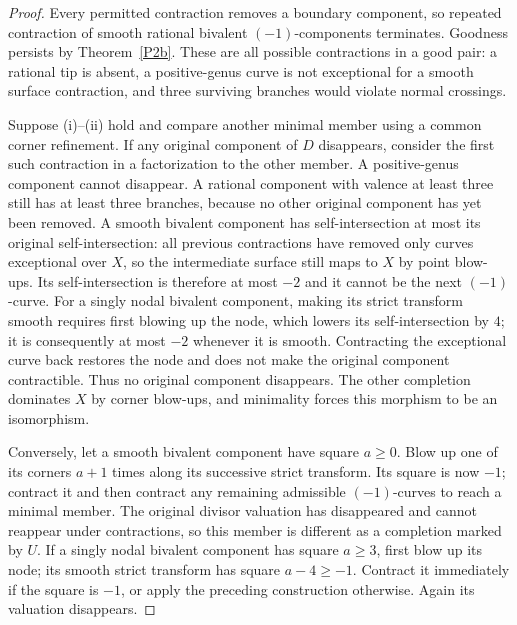 \begin{proof}
Every permitted contraction removes a boundary component, so repeated
contraction of smooth rational bivalent $(-1)$-components terminates.
Goodness persists by Theorem~\ref{P2b}.  These are all possible contractions in
a good pair: a rational tip is absent, a positive-genus curve is not exceptional
for a smooth surface contraction, and three surviving branches would violate
normal crossings.

Suppose (i)--(ii) hold and compare another minimal member using a common corner
refinement.  If any original component of $D$ disappears, consider the first
such contraction in a factorization to the other member.  A positive-genus
component cannot disappear.  A rational component with valence at least three
still has at least three branches, because no other original component has yet
been removed.  A smooth bivalent component has self-intersection at most its
original self-intersection: all previous contractions have removed only curves
exceptional over $X$, so the intermediate surface still maps to $X$ by point
blow-ups.  Its self-intersection is therefore at most $-2$ and it cannot be the
next $(-1)$-curve.  For a singly nodal bivalent component, making its strict
transform smooth requires first blowing up the node, which lowers its
self-intersection by $4$; it is consequently at most $-2$ whenever it is smooth.
Contracting the exceptional curve back restores the node and does not make the
original component contractible.  Thus no original component disappears.
The other completion dominates $X$ by corner blow-ups, and minimality forces
this morphism to be an isomorphism.

Conversely, let a smooth bivalent component have square $a\geq0$.  Blow up one
of its corners $a+1$ times along its successive strict transform.  Its square
is now $-1$; contract it and then contract any remaining admissible
$(-1)$-curves to reach a minimal member.  The original divisor valuation has
disappeared and cannot reappear under contractions, so this member is different
as a completion marked by $U$.  If a singly nodal bivalent component has square
$a\geq3$, first blow up its node; its smooth strict transform has square
$a-4\geq-1$.  Contract it immediately if the square is $-1$, or apply the
preceding construction otherwise.  Again its valuation disappears.
\end{proof}

